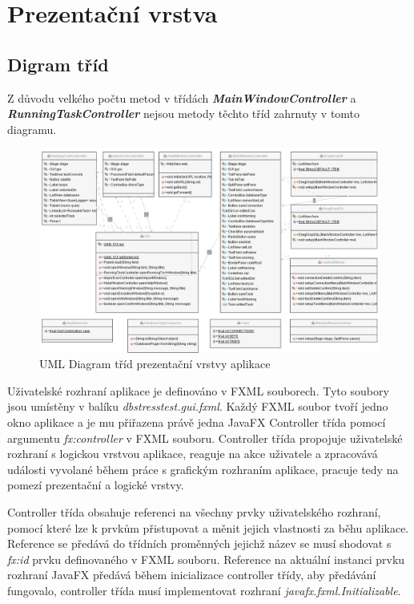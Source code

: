 \documentclass[czech,bachelor,public,dept460,male,cpdeclaration,twoside]{diploma}
\begin{document}
\newpage
\section{Prezentační vrstva} \label{presentlayer}
\subsection{Digram tříd} \label{prezent}
Z důvodu velkého počtu metod v třídách \textbf{\emph{MainWindowController}} a \textbf{\emph{RunningTaskController}} nejsou metody těchto tříd zahrnuty v tomto diagramu.

\begin{figure}[!htbp]\centering\includegraphics[width=1.0\textwidth]{Figures/PresentLayerDiagram.png}\caption{UML Diagram tříd prezentační vrstvy aplikace}
\end{figure}

Uživatelské rozhraní aplikace je definováno v FXML souborech. Tyto soubory jsou umístěny v balíku \textit{dbstresstest.gui.fxml}. Každý FXML soubor tvoří jedno okno aplikace a je mu přiřazena právě jedna JavaFX Controller třída pomocí argumentu \textit{fx:controller} v FXML souboru. Controller třída propojuje uživatelské rozhraní s logickou vrstvou aplikace, reaguje na akce uživatele a zpracovává události vyvolané během práce s grafickým rozhraním aplikace, pracuje tedy na pomezí prezentační a logické vrstvy.

Controller třída obsahuje referenci na všechny prvky uživatelského rozhraní, pomocí které lze k prvkům přistupovat a měnit jejich vlastnosti za běhu aplikace. Reference se předává do třídních proměnných jejichž název se musí shodovat s \textit{fx:id} prvku definovaného v FXML souboru. Reference na aktuální instanci prvku rozhraní JavaFX předává během inicializace controller třídy, aby předávání fungovalo, controller třída musí implementovat rozhraní \textit{javafx.fxml.Initializable}.
\end{document}
